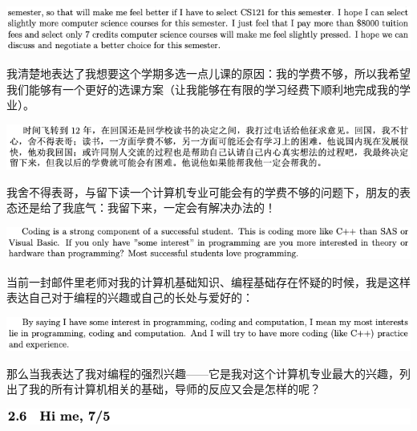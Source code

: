 \documentclass[9pt, b5paper]{article}
\begin{document}
\begin{center}
\includegraphics[width=.9\linewidth]{./pic/backups_plans_20210421_091430.png}
\end{center}

我清楚地表达了我想要这个学期多选一点儿课的原因：我的学费不够，所以我希望我们能够有一个更好的选课方案（让我能够在有限的学习经费下顺利地完成我的学业）。

\begin{center}
\includegraphics[width=.9\linewidth]{./pic/backups_plans_20210419_084632.png}
\end{center}

我舍不得表哥，与留下读一个计算机专业可能会有的学费不够的问题下，朋友的表态还是给了我底气：我留下来，一定会有解决办法的！

\begin{center}
\includegraphics[width=.9\linewidth]{./pic/backups_plans_20210421_091700.png}
\end{center}

当前一封邮件里老师对我的计算机基础知识、编程基础存在怀疑的时候，我是这样表达自己对于编程的兴趣或自己的长处与爱好的：

\begin{center}
\includegraphics[width=.9\linewidth]{./pic/backups_plans_20210419_085536.png}
\end{center}

那么当我表达了我对编程的强烈兴趣——它是我对这个计算机专业最大的兴趣，列出了我的所有计算机相关的基础，导师的反应又会是怎样的呢？

\begin{center}
\includegraphics[width=.9\linewidth]{./pic/backups_plans_20210421_092026.png}
\end{center}
\end{document}
